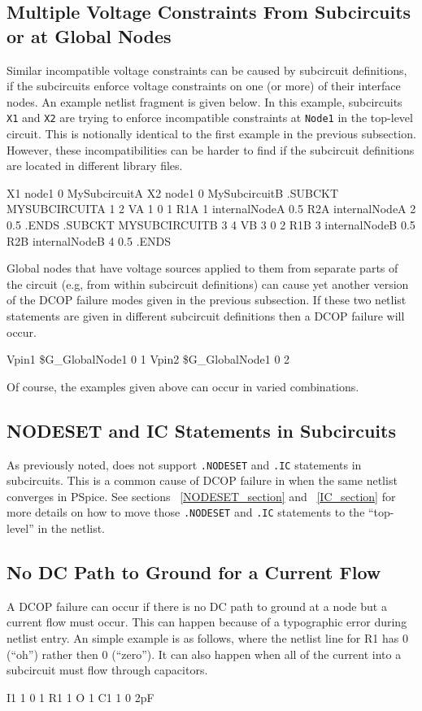 \subsection{Multiple Voltage Constraints From Subcircuits or at Global Nodes}
Similar incompatible voltage constraints can be caused by subcircuit definitions, if the 
subcircuits enforce voltage constraints on one (or more) of their interface nodes.  An
example netlist fragment is given below.  In this example, subcircuits \texttt{X1} and \texttt{X2}
are trying to enforce incompatible constraints at \texttt{Node1} in the top-level circuit.  
This is notionally identical to the first example in the previous subsection.  However, 
these incompatibilities can be harder to find if the subcircuit definitions are located in
different library files.
\begin{vquote}
X1 node1 0 MySubcircuitA
X2 node1 0 MySubcircuitB
.SUBCKT MYSUBCIRCUITA 1 2
VA 1 0 1 
R1A 1 internalNodeA 0.5
R2A internalNodeA 2 0.5
.ENDS 
.SUBCKT MYSUBCIRCUITB 3 4
VB 3 0 2 
R1B 3 internalNodeB 0.5
R2B internalNodeB 4 0.5
.ENDS 
\end{vquote}

Global nodes that have voltage sources applied to them from separate parts 
of the circuit (e.g, from within subcircuit definitions) can cause yet another
version of the DCOP failure modes given in the previous subsection.  If these
two netlist statements are given in different subcircuit definitions then a 
\Xyce{} DCOP failure will occur.
\begin{vquote}
Vpin1 \$G\_GlobalNode1 0 1
Vpin2 \$G\_GlobalNode1 0 2  
\end{vquote}
Of course, the examples given above can occur in varied combinations.

\subsection{NODESET and IC Statements in Subcircuits}
As previously noted, \Xyce{} does not support \texttt{.NODESET} and 
\texttt{.IC} statements in subcircuits.  This is a common cause of DCOP failure
in \Xyce{} when the same netlist converges in PSpice.  See sections ~\ref{NODESET_section} 
and ~\ref{IC_section} for more details on how to move those \texttt{.NODESET} and 
\texttt{.IC} statements to the ``top-level'' in the \Xyce{} netlist.

\subsection{No DC Path to Ground for a Current Flow}
A \Xyce{} DCOP failure can occur if there is no DC path to ground at a node but
a current flow must occur.  This can happen because of a typographic
error during netlist entry. An simple example is as follows, where the netlist 
line for R1 has 0 (``oh'') rather then 0 (``zero'').  It can also happen when
all of the current into a subcircuit must flow through capacitors.
\begin{vquote}
I1 1 0 1
R1 1 O 1
C1 1 0 2pF
\end{vquote}

